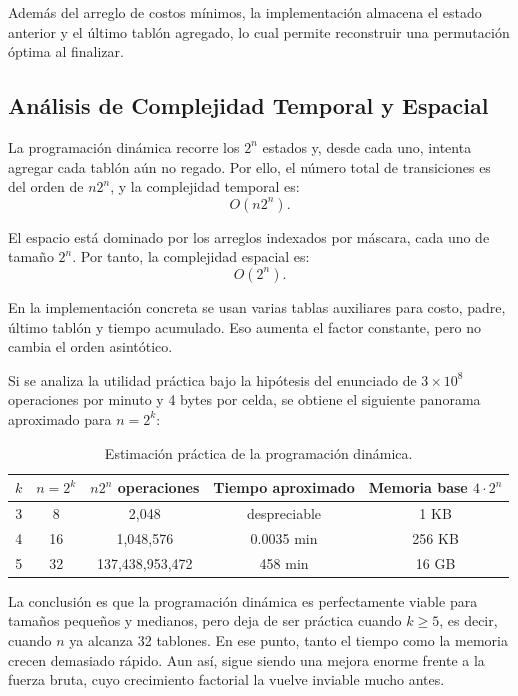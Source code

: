 \documentclass[12pt,a4paper]{article}
\begin{document}
Adem\'as del arreglo de costos m\'inimos, la implementaci\'on almacena el estado anterior y el \'ultimo tabl\'on agregado, lo cual permite reconstruir una permutaci\'on \'optima al finalizar.

\subsection{An\'alisis de Complejidad Temporal y Espacial}

La programaci\'on din\'amica recorre los \(2^n\) estados y, desde cada uno, intenta agregar cada tabl\'on a\'un no regado. Por ello, el n\'umero total de transiciones es del orden de \(n2^n\), y la complejidad temporal es:
\[
O(n2^n).
\]

El espacio est\'a dominado por los arreglos indexados por m\'ascara, cada uno de tama\~no \(2^n\). Por tanto, la complejidad espacial es:
\[
O(2^n).
\]

En la implementaci\'on concreta se usan varias tablas auxiliares para costo, padre, \'ultimo tabl\'on y tiempo acumulado. Eso aumenta el factor constante, pero no cambia el orden asint\'otico.

Si se analiza la utilidad pr\'actica bajo la hip\'otesis del enunciado de \(3\times 10^8\) operaciones por minuto y 4 bytes por celda, se obtiene el siguiente panorama aproximado para \(n = 2^k\):

\begin{table}[ht]
  \centering
  \begin{tabular}{ccccc}
    \toprule
    \(k\) & \(n=2^k\) & \(n2^n\) operaciones & Tiempo aproximado & Memoria base \(4 \cdot 2^n\) \\
    \midrule
    3 & 8  & 2,048              & despreciable & 1 KB \\
    4 & 16 & 1,048,576          & 0.0035 min   & 256 KB \\
    5 & 32 & 137,438,953,472    & 458 min      & 16 GB \\
    \bottomrule
  \end{tabular}
  \caption{Estimaci\'on pr\'actica de la programaci\'on din\'amica.}
\end{table}

La conclusi\'on es que la programaci\'on din\'amica es perfectamente viable para tama\~nos peque\~nos y medianos, pero deja de ser pr\'actica cuando \(k \geq 5\), es decir, cuando \(n\) ya alcanza 32 tablones. En ese punto, tanto el tiempo como la memoria crecen demasiado r\'apido. Aun as\'i, sigue siendo una mejora enorme frente a la fuerza bruta, cuyo crecimiento factorial la vuelve inviable mucho antes.
\end{document}
